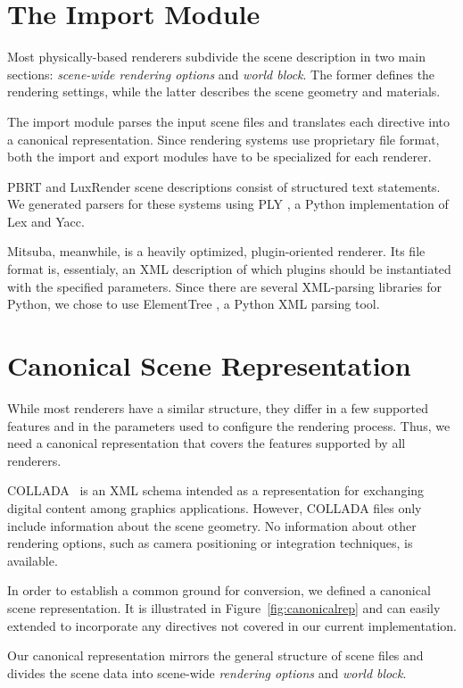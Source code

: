 \section{The Import Module}
Most physically-based renderers subdivide the scene description in two main sections: {\it scene-wide rendering options} and {\it world block}. The former defines the rendering settings, while the latter describes the scene geometry and materials.

The import module parses the input scene files and translates each directive into a canonical representation. Since rendering systems use proprietary file format, both the import and export modules have to be specialized for each renderer.

PBRT and LuxRender scene descriptions consist of structured text statements. We generated parsers for these systems using PLY \cite{ply}, a Python implementation of Lex and Yacc.

Mitsuba, meanwhile, is a heavily optimized, plugin-oriented renderer. Its file format is, essentialy, an XML description of which plugins should be instantiated with the specified parameters. Since there are several XML-parsing libraries for Python, we chose to use ElementTree \cite{ET}, a Python XML parsing tool.

\section{Canonical Scene Representation}
While most renderers have a similar structure, they differ in a few supported features and in the parameters used to configure the rendering process. Thus, we need a canonical representation that covers the features supported by all renderers. 

COLLADA~\cite{collada} is an XML schema intended as a representation for exchanging digital content among graphics applications. However, COLLADA files only include information about the scene geometry. No information about other rendering options, such as camera positioning or integration techniques, is available. 

In order to establish a common ground for conversion, we defined a canonical scene representation. It is illustrated in Figure~\ref{fig:canonicalrep} and can easily extended to incorporate any directives not covered in our current implementation.
 
Our canonical representation mirrors the general structure of scene files and divides the scene data into scene-wide {\it rendering options} and {\it world block}. 

